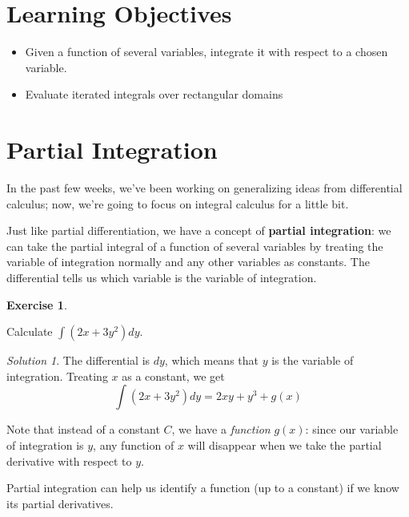 \documentclass[
]{book}
\providecommand{\tightlist}{%
  \setlength{\itemsep}{0pt}\setlength{\parskip}{0pt}}
\theoremstyle{definition}
\theoremstyle{definition}
\theoremstyle{definition}
\newtheorem{exercise}{Exercise}[chapter]
\theoremstyle{definition}
\theoremstyle{remark}
\newtheorem*{solution}{Solution}
\begin{document}
\hypertarget{learning-objectives-9}{%
\section{Learning Objectives}\label{learning-objectives-9}}

\begin{itemize}
\tightlist
\item
  Given a function of several variables, integrate it with respect to a chosen variable.
\item
  Evaluate iterated integrals over rectangular domains
\end{itemize}

\hypertarget{partial-integration}{%
\section{Partial Integration}\label{partial-integration}}

In the past few weeks, we've been working on generalizing ideas from differential calculus; now, we're going to focus on integral calculus for a little bit.

Just like partial differentiation, we have a concept of \textbf{partial integration}: we can take the partial integral of a function of several variables by treating the variable of integration normally and any other variables as constants. The differential tells us which variable is the variable of integration.

\begin{exercise}
\protect\hypertarget{exr:unlabeled-div-72}{}\label{exr:unlabeled-div-72}

Calculate \(\displaystyle \int (2x+3y^2)dy\).

\end{exercise}

\begin{solution}

The differential is \(dy\), which means that \(y\) is the variable of integration. Treating \(x\) as a constant, we get
\[\displaystyle \int (2x+3y^2)dy  = 2xy + y^3 + g(x)\]

Note that instead of a constant \(C\), we have a \emph{function} \(g(x)\): since our variable of integration is \(y\), any function of \(x\) will disappear when we take the partial derivative with respect to \(y\).

\end{solution}

Partial integration can help us identify a function (up to a constant) if we know its partial derivatives.
\end{document}
